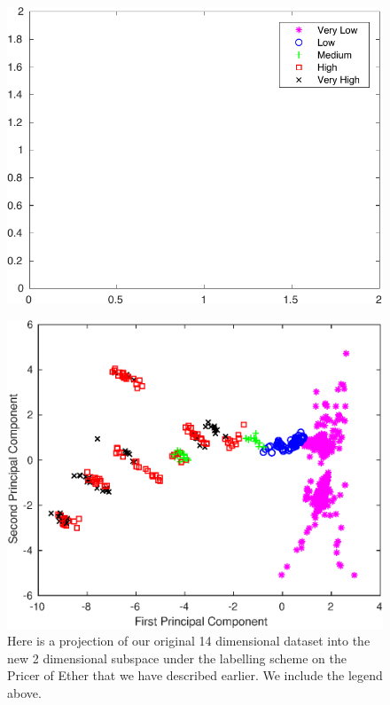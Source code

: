 \documentclass{article}
\begin{document}
\begin{figure}[H]
\centering
\includegraphics[scale = 0.7]{main/legend_2D_proj_copy.pdf}
\end{figure}
\begin{figure}[H]
\centering
\caption{Here is a projection of our original 14 dimensional dataset into the new 2 dimensional subspace under the labelling scheme on the Pricer of Ether that we have described earlier. We include the legend above.}
\includegraphics{main/eth_2d_projection.eps}
\end{figure}
\end{document}
